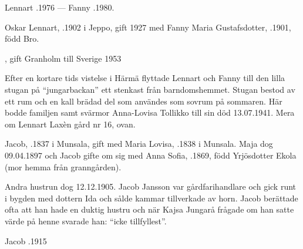 Lennart .1976  ---  Fanny .1980.





Oskar Lennart, .1902 i Jeppo, gift 1927 med Fanny Maria Gustafsdotter, .1901, född Bro.
\begin{jhchildren}
  \item {}, gift Granholm till Sverige 1953
  \item {}
  \item {}
\end{jhchildren}

Efter en kortare tids vistelse i Härmä flyttade Lennart och Fanny till den lilla stugan på ``jungarbackan'' ett stenkast från barndomshemmet. Stugan bestod av ett rum och en kall brädad del som användes som sovrum på sommaren. Här bodde familjen samt svärmor Anna-Lovisa Tollikko till sin död 13.07.1941. Mera om Lennart Laxèn gård nr 16, ovan.


Jacob, .1837 i Munsala, gift med Maria Lovisa, .1838 i Munsala. Maja dog 09.04.1897 och Jacob gifte om sig med Anna Sofia, .1869, född Yrjösdotter Ekola (mor hemma från granngården).
\begin{jhchildren}
  \item {}
  \item {}
  \item {}
\end{jhchildren}
Andra hustrun dog 12.12.1905. Jacob Jansson var gårdfarihandlare och gick runt i bygden med dottern Ida och sålde kammar tillverkade av horn. Jacob berättade ofta att han hade en duktig hustru och när Kajsa Jungarå frågade om han satte värde på henne svarade han: ``icke tillfyllest''.

Jacob .1915



